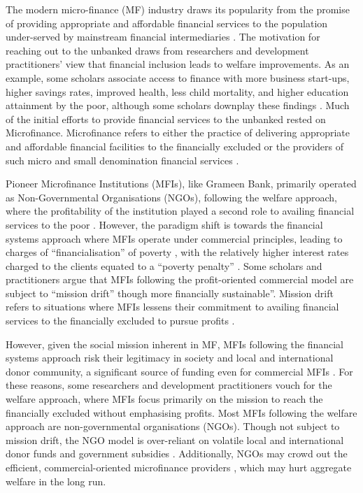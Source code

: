 \documentclass[a4paper,nobind]{templates/ociamthesis}
\begin{document}
The modern micro-finance (MF) industry draws its popularity from the promise of providing appropriate and affordable financial services to the population under-served by mainstream financial intermediaries \autocite{morduch1999microfinance,morduch2000microfinance}. The motivation for reaching out to the unbanked draws from researchers and development practitioners' view that financial inclusion leads to welfare improvements. As an example, some scholars associate access to finance with more business start-ups, higher savings rates, improved health, less child mortality, and higher education attainment by the poor, although some scholars downplay these findings \autocite{klapper2015role,o2017systematic,shahriar2017lender}. Much of the initial efforts to provide financial services to the unbanked rested on Microfinance. Microfinance refers to either the practice of delivering appropriate and affordable financial facilities to the financially excluded or the providers of such micro and small denomination financial services \autocite{ledgerwood2006transforming}.

Pioneer Microfinance Institutions (MFIs), like Grameen Bank, primarily operated as Non-Governmental Organisations (NGOs), following the welfare approach, where the profitability of the institution played a second role to availing financial services to the poor \autocite{chahine2010social,d2017ngos}. However, the paradigm shift is towards the financial systems approach where MFIs operate under commercial principles, leading to charges of ``financialisation'' of poverty \autocite{mader2015financialization}, with the relatively higher interest rates charged to the clients equated to a ``poverty penalty'' \autocite{chen2017microfinance}. Some scholars and practitioners argue that MFIs following the profit-oriented commercial model are subject to ``mission drift'' though more financially sustainable''. Mission drift refers to situations where MFIs lessens their commitment to availing financial services to the financially excluded to pursue profits \autocite{jia2016commercialization,mia2017mission}.

However, given the social mission inherent in MF, MFIs following the financial systems approach risk their legitimacy in society and local and international donor community, a significant source of funding even for commercial MFIs \autocite{nason2018behavioral}. For these reasons, some researchers and development practitioners vouch for the welfare approach, where MFIs focus primarily on the mission to reach the financially excluded without emphasising profits. Most MFIs following the welfare approach are non-governmental organisations (NGOs). Though not subject to mission drift, the NGO model is over-reliant on volatile local and international donor funds and government subsidies \autocite{garmaise2013cheap,d2017aid}. Additionally, NGOs may crowd out the efficient, commercial-oriented microfinance providers \autocite{kota2007}, which may hurt aggregate welfare in the long run.
\end{document}
